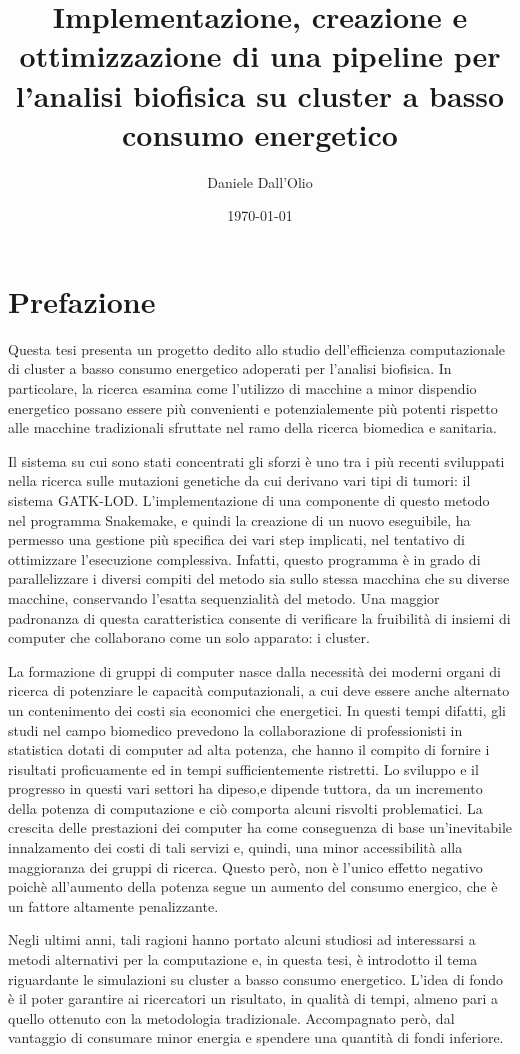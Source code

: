 \documentclass[12pt, a4paper]{report}
\title{Implementazione, creazione e ottimizzazione di una pipeline per l'analisi biofisica su cluster a basso consumo energetico}
\author{Daniele Dall'Olio}
\date{\today}
\begin{document}
\tableofcontents

\section*{Prefazione}
Questa tesi presenta un progetto dedito allo studio dell'efficienza computazionale di cluster a basso consumo energetico adoperati per l'analisi biofisica.
In particolare, la ricerca esamina come l'utilizzo di macchine a minor dispendio energetico possano essere più convenienti e potenzialemente più potenti rispetto alle macchine tradizionali sfruttate nel ramo della ricerca biomedica e sanitaria.


Il sistema su cui sono stati concentrati gli sforzi è uno tra i più recenti sviluppati nella ricerca sulle mutazioni genetiche da cui derivano vari tipi di tumori: il sistema GATK-LOD.
L'implementazione di una componente di questo metodo nel programma Snakemake, e quindi la creazione di un nuovo eseguibile, ha permesso una gestione più specifica dei vari step implicati, nel tentativo di ottimizzare l'esecuzione complessiva. 
Infatti, questo programma è in grado di parallelizzare i diversi compiti del metodo sia sullo stessa macchina che su diverse macchine, conservando l'esatta sequenzialità del metodo.
Una maggior padronanza di questa caratteristica consente di verificare la fruibilità di insiemi di computer che collaborano come un solo apparato: i cluster.

La formazione di gruppi di computer nasce dalla necessità dei moderni organi di ricerca di potenziare le capacità computazionali, a cui deve essere anche alternato un contenimento dei costi sia economici che energetici.
In questi tempi difatti, gli studi nel campo biomedico prevedono la collaborazione di professionisti in statistica dotati di computer ad alta potenza, che hanno il compito di fornire i risultati proficuamente ed in tempi sufficientemente ristretti.
Lo sviluppo e il progresso in questi vari settori ha dipeso,e dipende tuttora, da un incremento della potenza di computazione e ciò comporta alcuni risvolti problematici.
La crescita delle prestazioni dei computer ha come conseguenza di base un'inevitabile innalzamento dei costi di tali servizi e, quindi, una minor accessibilità alla maggioranza dei gruppi di ricerca.
Questo però, non è l'unico effetto negativo poichè all'aumento della potenza segue un aumento del consumo energico, che è un fattore altamente penalizzante.

Negli ultimi anni, tali ragioni hanno portato alcuni studiosi ad interessarsi a metodi alternativi per la computazione e, in questa tesi, è introdotto il tema riguardante le simulazioni su cluster a basso consumo energetico.
L'idea di fondo è il poter garantire ai ricercatori un risultato, in qualità di tempi, almeno pari a quello ottenuto con la metodologia tradizionale.
Accompagnato però, dal vantaggio di consumare minor energia e spendere una quantità di fondi inferiore.
\end{document}
